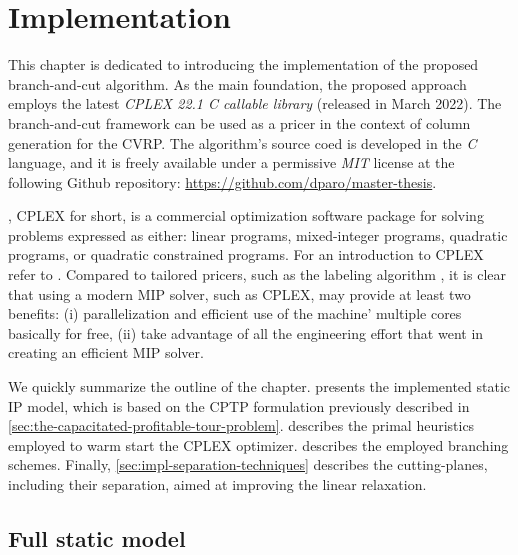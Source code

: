\chapter{Implementation}
\label{sec:implementation-chapter}

This chapter is dedicated to introducing the implementation
of the proposed branch-and-cut algorithm.
As the main foundation, the proposed approach employs
the latest \textit{CPLEX 22.1 C callable library} (released in March 2022).
The branch-and-cut framework can be used as a pricer in the context
of column generation for the CVRP.
The algorithm's source coed is developed in the \textit{C} language,
and it is freely available under a permissive \textit{MIT} license
at the following Github repository: \url{https://github.com/dparo/master-thesis}.

\medskip

,
CPLEX for short,
is a commercial optimization software package for solving problems expressed as either:
linear programs, mixed-integer programs, quadratic programs, or quadratic constrained programs.
For an introduction to CPLEX refer to .
Compared to tailored pricers, such as the labeling algorithm \parencite{desrochers1992, feillet2004},
it is clear that using a modern MIP solver, such as CPLEX,
may provide at least two benefits:
(i) parallelization and efficient use of the machine' multiple cores basically for free,
(ii) take advantage of all the engineering effort that went in creating an efficient MIP solver.

\medskip

We quickly summarize the outline of the chapter.
 presents the implemented static IP model,
which is based on the CPTP formulation previously described in \cref{sec:the-capacitated-profitable-tour-problem}.
 describes the primal heuristics employed
to warm start the CPLEX optimizer.
 describes the employed branching schemes.
Finally, \cref{sec:impl-separation-techniques} describes the cutting-planes,
including their separation,
aimed at improving the linear relaxation.

\section{Full static model}
\label{sec:impl-full-static-model}

